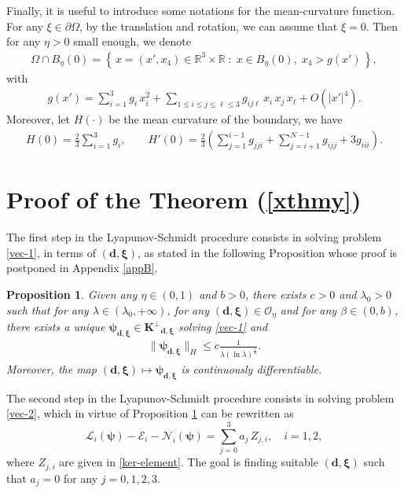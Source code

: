\documentclass[a4paper,reqno,11pt,oneside]{amsart}
\numberwithin{equation}{section}
\newtheorem{Prop}[Thm]{Proposition}
\begin{document}
Finally, it is useful to introduce some notations for the mean-curvature function. For any $\xi \in \partial \Omega$, by the translation and rotation, we can assume that $\xi=0$. Then for any $\eta>0$ small enough, we denote 
\begin{align*}
  \Omega \cap B_\eta(0) =\left\{\, x = (x',x_{4}) \in \mathbb{R}^{3} \times \mathbb{R} \; : \; x \in B_\eta(0), \; x_{4} >g \left( x'\right)\,\right\},  
\end{align*}
with  
\begin{align*}
  g  \left( x' \right)= \sum_{i=1}^{3} g_{i} \,x^{2}_{i} + \sum_{1 \leq i \leq j \leq \ell \leq 3} g_{ij\ell}\, x_{i}\,x_{j} \,x_{\ell}
+ O\!\left(| x'|^{4}\right).  
\end{align*}
Moreover,  let $H(\cdot)$ be the mean curvature of the boundary, we have  
\begin{align*}
    H(0) = \frac{2}{3} \sum_{i=1}^{3} g_{i}, 
\qquad 
H'(0) = \frac{2}{3} \left( \sum_{j=1}^{i-1} g_{jji} + \sum_{j=i+1}^{N-1} g_{ijj} + 3 g_{iii} \right).
\end{align*}

\section{Proof of the Theorem (\ref{xthmy})}\label{three}



The  first step in the  Lyapunov-Schmidt procedure consists in solving problem \eqref{vec-1}, in terms of $\left(\bm{d}, \bm{\xi}\right)$,
as stated in the following Proposition whose proof is postponed in Appendix \ref{appB}.

\begin{Prop}\label{error-size}
Given any $\eta\in(0,1)$ and $b>0$, there exists $c>0$ and $\lambda_0>0$ such that for any $\lambda \in (\lambda_0,+\infty)$, for any $\left(\bm{d}, \bm{\xi}\right)\in \mathcal{O}_\eta$ and for any $\beta\in (0,b)$, there exists a unique $\bm{\psi}_{\bm{d},\bm{\xi}} \in \bm{K^{\perp}}_{\bm{d},\bm{\xi}}$ solving \eqref{vec-1} and
    \begin{align}\label{error-size-2}
    \|\bm{\psi}_{\bm{d},\bm{\xi}}\|_{H}\leq c\frac1{\lambda\left(\ln\lambda\right)^\frac13}.
\end{align}
Moreover, the map $ (\bm{d}, \bm{\xi}) \mapsto \bm{\psi}_{\bm{d}, \bm{\xi}}
$
is continuously differentiable.
\end{Prop}


  \vspace{0.2cm}
The second step in the Lyapunov-Schmidt procedure consists in solving  problem \eqref{vec-2}, which in virtue of Proposition \ref{error-size} can be rewritten as
$$
    \mathcal{L}_i(\bm{\psi})-\mathcal{E}_i-\mathcal{N}_i(\bm{\psi}) =\sum\limits_{j=0}^{3}{ a_j}\,Z_{j,i},\quad i=1,2,
$$
where $Z_{j,i}$ are given in \eqref{ker-element}. The goal is finding suitable $(\bm{d}, \bm{\xi})$ such that  $a_j=0$  for any $j=0,1,2,3$. 
\end{document}

